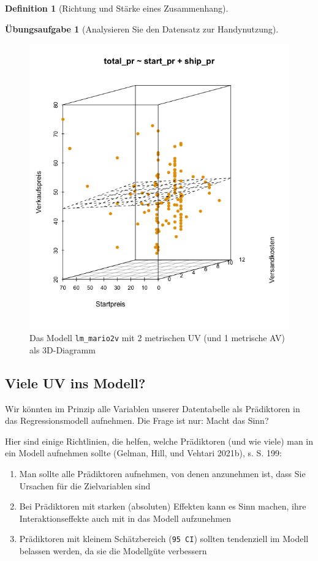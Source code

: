 \documentclass[
  a4paper,
  DIV=11]{scrreprt}
\providecommand{\tightlist}{%
  \setlength{\itemsep}{0pt}\setlength{\parskip}{0pt}}\usepackage{longtable,booktabs,array}
\theoremstyle{definition}
\newtheorem{exercise}{Übungsaufgabe}[chapter]
\theoremstyle{definition}
\theoremstyle{definition}
\newtheorem{definition}{Definition}[chapter]
\theoremstyle{remark}
\begin{document}
\begin{definition}[Richtung und Stärke eines
Zusammenhang]
\begin{exercise}[Analysieren Sie den Datensatz zur
Handynutzung]
\begin{figure}
\begin{minipage}{0.33\linewidth}
\includegraphics{img/3d_scatter_mario3.png}

\end{minipage}%

\caption{\label{fig-3d-regr-statisch}Das Modell \texttt{lm\_mario2v} mit
2 metrischen UV (und 1 metrische AV) als 3D-Diagramm}

\end{figure}%

\subsection{Viele UV ins Modell?}\label{viele-uv-ins-modell}

Wir könnten im Prinzip alle Variablen unserer Datentabelle als
Prädiktoren in das Regressionsmodell aufnehmen. Die Frage ist nur: Macht
das Sinn?

Hier sind einige Richtlinien, die helfen, welche Prädiktoren (und wie
viele) man in ein Modell aufnehmen sollte (Gelman, Hill, und Vehtari
2021b), s. S. 199:

\begin{enumerate}
\def\labelenumi{\arabic{enumi}.}
\tightlist
\item
  Man sollte alle Prädiktoren aufnehmen, von denen anzunehmen ist, dass
  Sie Ursachen für die Zielvariablen sind
\item
  Bei Prädiktoren mit starken (absoluten) Effekten kann es Sinn machen,
  ihre Interaktionseffekte auch mit in das Modell aufzunehmen
\item
  Prädiktoren mit kleinem Schätzbereich (\texttt{95\ CI}) sollten
  tendenziell im Modell belassen werden, da sie die Modellgüte
  verbessern
\end{enumerate}


\end{exercise}
\end{definition}
\end{document}

